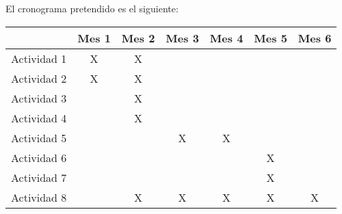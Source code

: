 \documentclass[a4paper]{article}
\begin{document}
El cronograma pretendido es el siguiente:


\begin{tabular}{ | c |c |c |c |c |c |c | }
	
	\hline \hline

	& Mes 1 & Mes 2 & Mes 3 & Mes 4 & Mes 5 & Mes 6 \\
	
	\hline
	
	Actividad 1 & X & X & & & & \\
	
	\hline
	
	Actividad 2 & X & X & & & & \\

	\hline
	
	Actividad 3 & & X & & & & \\

	\hline
	
	Actividad 4 & & X & & & & \\

	\hline
	
	Actividad 5 & & & X & X & & \\

	\hline
	
	Actividad 6 & & & & & X & \\

	\hline
	
	Actividad 7 & & & & & X & \\

	\hline
	
	Actividad 8 & & X & X & X & X & X\\
	
	\hline \hline

\end{tabular}





\end{document}
